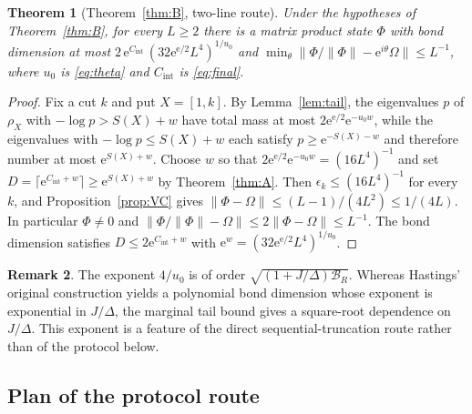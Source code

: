\documentclass[aps,prx,reprint,superscriptaddress,floatfix,nofootinbib,longbibliography,amsmath,amssymb]{revtex4-2}
\newcommand{\norm}[1]{\lVert #1\rVert}
\newcommand{\cB}{\mathcal B}
\newcommand{\Om}{\Omega}
\newcommand{\e}{\mathrm e}
\theoremstyle{plain}
\newtheorem{theorem}{Theorem}[section]
\theoremstyle{definition}
\newtheorem{remark}[theorem]{Remark}
\begin{document}
\begin{theorem}[Theorem~\ref{thm:B}, two-line route]\label{thm:Bshort}
Under the hypotheses of Theorem~\ref{thm:B}, for every $L\ge2$ there is
a matrix product state $\Phi$ with bond dimension at most
$2\,\e^{C_{\mathrm{int}}}\,(32\e^{\e/2}L^4)^{1/u_0}$ and
$\min_\theta\norm{\Phi/\norm\Phi-\e^{i\theta}\Om}\le L^{-1}$, where $u_0$ is
\eqref{eq:theta} and $C_{\mathrm{int}}$ is \eqref{eq:final}.
\end{theorem}
\begin{proof}
Fix a cut $k$ and put $X=[1,k]$. By Lemma~\ref{lem:tail}, the eigenvalues
$p$ of $\rho_X$ with $-\log p>S(X)+w$ have total mass at most
$2\e^{\e/2}\e^{-u_0w}$, while the eigenvalues with $-\log p\le S(X)+w$ each
satisfy $p\ge\e^{-S(X)-w}$ and therefore number at most $\e^{S(X)+w}$.
Choose $w$ so that $2\e^{\e/2}\e^{-u_0w}=(16L^4)^{-1}$ and set
$D=\lceil\e^{C_{\mathrm{int}}+w}\rceil\ge\e^{S(X)+w}$ by Theorem~\ref{thm:A}.
Then $\epsilon_k\le(16L^4)^{-1}$ for every $k$, and Proposition~\ref{prop:VC}
gives $\norm{\Phi-\Om}\le(L-1)/(4L^2)\le1/(4L)$. In particular $\Phi\ne0$
and $\norm{\Phi/\norm\Phi-\Om}\le2\norm{\Phi-\Om}\le L^{-1}$. The bond
dimension satisfies $D\le2\e^{C_{\mathrm{int}}+w}$ with
$\e^{w}=(32\e^{\e/2}L^4)^{1/u_0}$.
\end{proof}

\begin{remark}
The exponent $4/u_0$ is of order $\sqrt{(1+J/\Delta)\cB_R}$. Whereas
Hastings' original construction yields a polynomial bond dimension whose
exponent is exponential in $J/\Delta$, the marginal tail bound gives a
square-root dependence on $J/\Delta$. This exponent is a feature of the
direct sequential-truncation route rather than of the protocol below.
\end{remark}

\subsection*{Plan of the protocol route}
\end{document}
